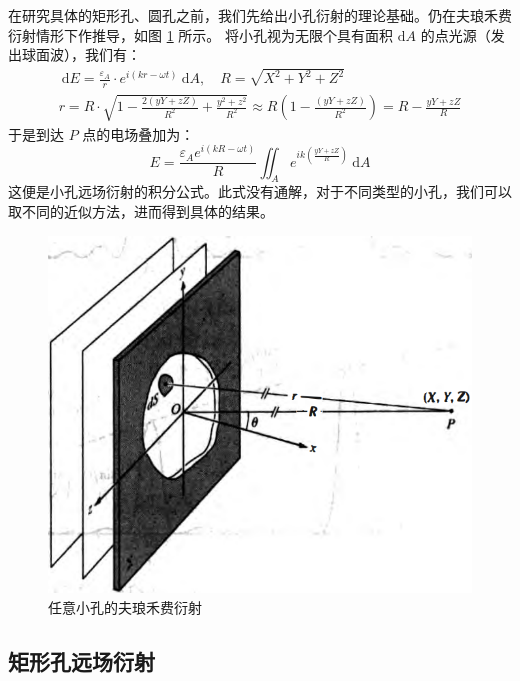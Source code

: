 \documentclass[UTF8]{report}
\theoremstyle{MyLineTheoremStyle} %
\theoremstyle{MyBlockTheoremStyle} %
\theoremstyle{MySubsubsectionStyle} %
\begin{document}
在研究具体的矩形孔、圆孔之前，我们先给出小孔衍射的理论基础。仍在夫琅禾费衍射情形下作推导，如图 \ref{任意小孔的夫琅禾费衍射} 所示。
将小孔视为无限个具有面积 $\mathrm{d}A$ 的点光源（发出球面波），我们有：
\begin{gather}
\ \mathrm{d}E = \frac{\varepsilon_A}{r} \cdot e^{i(kr - \omega t)} \ \mathrm{d}A,\quad R  =\sqrt{X^2 + Y^2 + Z^2} \\ 
r  = R\cdot \sqrt{ 1 - \frac{2\left(yY + zZ\right)}{R^2} +  \frac{y^2 + z^2}{R^2} }  \approx  R\left(1 - \frac{\left(yY + zZ\right)}{R^2}  \right) = R - \frac{yY + zZ}{R}
\end{gather}
于是到达 $P$ 点的电场叠加为：
\begin{equation}\label{小孔衍射积分公式}
E = \frac{\varepsilon_A e^{i(kR - \omega t)}}{R} \iint_{A} e^{ik \left(\frac{yY + zZ}{R}\right)} \ \mathrm{d}A
\end{equation}
这便是小孔远场衍射的积分公式。此式没有通解，对于不同类型的小孔，我们可以取不同的近似方法，进而得到具体的结果。
\begin{figure}[H]\centering
    \includegraphics[width=0.5\columnwidth]{assets/4/4.3 小孔衍射.png}
    \caption{任意小孔的夫琅禾费衍射}\label{任意小孔的夫琅禾费衍射}
\end{figure}

\subsection{矩形孔远场衍射}
\end{document}
